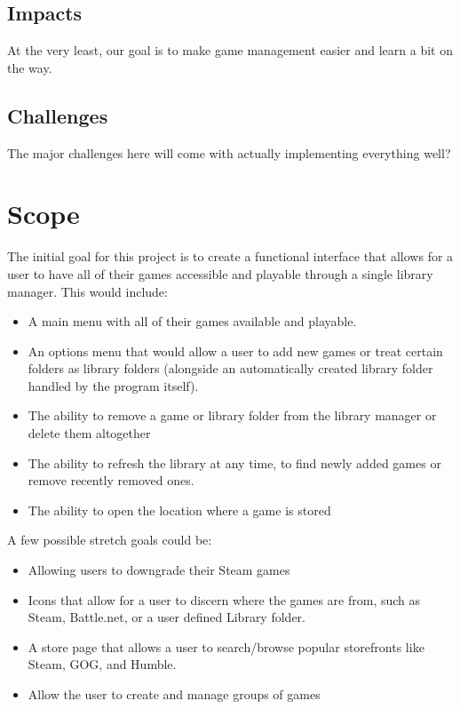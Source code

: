 \documentclass[10pt,conference,onecolumn,compsoc]{IEEEtran}
\begin{document}
\subsection{Impacts}
At the very least, our goal is to make game management easier and learn a bit on the way.

\subsection{Challenges}
The major challenges here will come with actually implementing everything well?

\section{Scope}
The initial goal for this project is to create a functional interface that allows for a user to have all of their games accessible and playable through a single library manager. This would include:

\begin{itemize}
\item A main menu with all of their games available and playable.
\item An options menu that would allow a user to add new games or treat certain folders as library folders (alongside an automatically created library folder handled by the program itself).
\item The ability to remove a game or library folder from the library manager or delete them altogether
\item The ability to refresh the library at any time, to find newly added games or remove recently removed ones.
\item The ability to open the location where a game is stored
\end{itemize}

A few possible stretch goals could be:

\begin{itemize}
\item Allowing users to downgrade their Steam games
\item Icons that allow for a user to discern where the games are from, such as Steam, Battle.net, or a user defined Library folder.
\item A store page that allows a user to search/browse popular storefronts like Steam, GOG, and Humble.
\item Allow the user to create and manage groups of games
\end{itemize}
\end{document}
